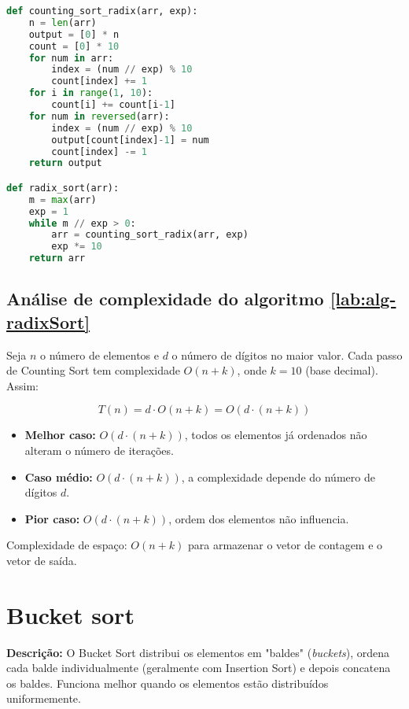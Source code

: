\begin{lstlisting}[language=Python,caption={Radix sort em Python},captionpos=t]
def counting_sort_radix(arr, exp):
    n = len(arr)
    output = [0] * n
    count = [0] * 10
    for num in arr:
        index = (num // exp) % 10
        count[index] += 1
    for i in range(1, 10):
        count[i] += count[i-1]
    for num in reversed(arr):
        index = (num // exp) % 10
        output[count[index]-1] = num
        count[index] -= 1
    return output

def radix_sort(arr):
    m = max(arr)
    exp = 1
    while m // exp > 0:
        arr = counting_sort_radix(arr, exp)
        exp *= 10
    return arr
\end{lstlisting}

\subsection{Análise de complexidade do algoritmo \ref{lab:alg-radixSort}}

Seja $n$ o número de elementos e $d$ o número de dígitos no maior valor. Cada passo de Counting Sort tem complexidade $O(n + k)$, onde $k=10$ (base decimal). Assim:

\[
T(n) = d \cdot O(n + k) = O(d \cdot (n + k))
\]

\begin{itemize}
    \item \textbf{Melhor caso:} $O(d \cdot (n+k))$, todos os elementos já ordenados não alteram o número de iterações.
    \item \textbf{Caso médio:} $O(d \cdot (n+k))$, a complexidade depende do número de dígitos $d$.
    \item \textbf{Pior caso:} $O(d \cdot (n+k))$, ordem dos elementos não influencia.
\end{itemize}

Complexidade de espaço: $O(n+k)$ para armazenar o vetor de contagem e o vetor de saída.

\section{Bucket sort}
\textbf{Descrição:} O Bucket Sort distribui os elementos em "baldes" (\textit{buckets}), ordena cada balde individualmente (geralmente com Insertion Sort) e depois concatena os baldes. Funciona melhor quando os elementos estão distribuídos uniformemente.

